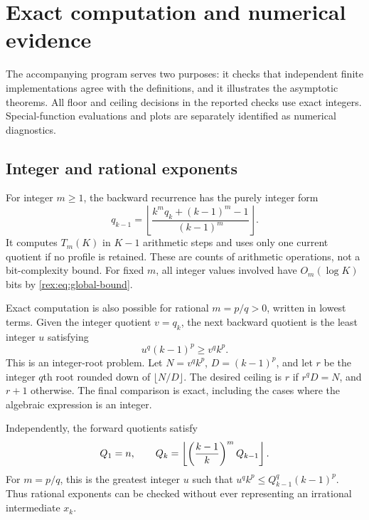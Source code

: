 \section{Exact computation and numerical evidence}\label{rex:sec:computation}

The accompanying program serves two purposes: it checks that independent
finite implementations agree with the definitions, and it illustrates
the asymptotic theorems. All floor and ceiling decisions in the reported
checks use exact integers. Special-function evaluations and plots are
separately identified as numerical diagnostics.

\subsection{Integer and rational exponents}

For integer $m\geq1$, the backward recurrence has the purely integer form
\begin{equation}\label{rex:eq:integer-algorithm}
 q_{k-1}=\left\lfloor
 \frac{k^m q_k+(k-1)^m-1}{(k-1)^m}
 \right\rfloor.
\end{equation}
It computes $T_m(K)$ in $K-1$ arithmetic steps and uses only one current
quotient if no profile is retained. These are counts of arithmetic
operations, not a bit-complexity bound. For fixed $m$, all integer
values involved have $O_m(\log K)$ bits by \cref{rex:eq:global-bound}.

Exact computation is also possible for rational $m=p/q>0$, written in
lowest terms. Given the integer quotient $v=q_k$, the next backward
quotient is the least integer $u$ satisfying
\begin{equation}\label{rex:eq:rational-root}
 u^q(k-1)^p\geq v^q k^p.
\end{equation}
This is an integer-root problem. Let
$N=v^qk^p$, $D=(k-1)^p$, and let $r$ be the integer $q$th root rounded
down of $\lfloor N/D\rfloor$. The desired ceiling is $r$ if
$r^qD=N$, and $r+1$ otherwise. The final comparison is exact, including
the cases where the algebraic expression is an integer.

Independently, the forward quotients satisfy
\begin{equation}\label{rex:eq:forward-quotient}
 Q_1=n,\qquad
 Q_k=\left\lfloor \left(\frac{k-1}{k}\right)^m Q_{k-1}\right\rfloor.
\end{equation}
For $m=p/q$, this is the greatest integer $u$ such that
$u^q k^p\leq Q_{k-1}^q(k-1)^p$. Thus rational exponents can be
checked without ever representing an irrational intermediate $x_k$.

